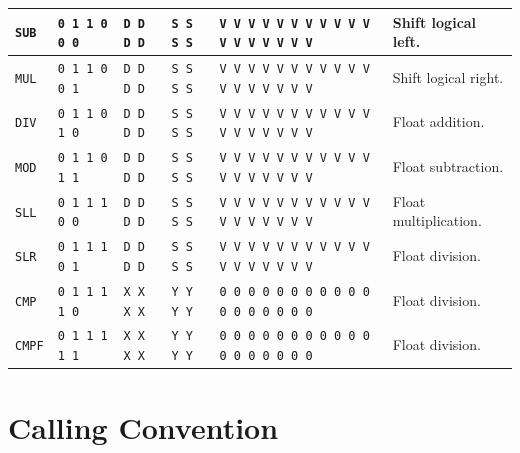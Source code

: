 \documentclass{report}
\begin{document}
{\begin{center}
\begin{tabular}[ht]{
	| p{} | p{} | p{} | p{}
	| p{} | p{} |
}
	\texttt{SUB} & \texttt{0 1 1 0 0 0} & \texttt{D D D D} & \texttt{S S S S} &
		\texttt{V V V V V V V V V V V V V V V V V V} & Shift logical left. \\
	\hline
	
	\texttt{MUL} & \texttt{0 1 1 0 0 1} & \texttt{D D D D} & \texttt{S S S S} &
		\texttt{V V V V V V V V V V V V V V V V V V} & Shift logical right. \\
	\hline
	
	\texttt{DIV} & \texttt{0 1 1 0 1 0} & \texttt{D D D D} & \texttt{S S S S} &
		\texttt{V V V V V V V V V V V V V V V V V V} & Float addition. \\
	\hline
	
	\texttt{MOD} & \texttt{0 1 1 0 1 1} & \texttt{D D D D} & \texttt{S S S S} &
		\texttt{V V V V V V V V V V V V V V V V V V} & Float subtraction. \\
	\hline
	
	\texttt{SLL} & \texttt{0 1 1 1 0 0} & \texttt{D D D D} & \texttt{S S S S} &
		\texttt{V V V V V V V V V V V V V V V V V V} & Float multiplication. \\
	\hline
	
	\texttt{SLR} & \texttt{0 1 1 1 0 1} & \texttt{D D D D} & \texttt{S S S S} &
		\texttt{V V V V V V V V V V V V V V V V V V} & Float division. \\
	\hline
	
	\texttt{CMP} & \texttt{0 1 1 1 1 0} & \texttt{X X X X} & \texttt{Y Y Y Y} &
		\texttt{0 0 0 0 0 0 0 0 0 0 0 0 0 0 0 0 0 0} & Float division. \\
	\hline
	
	\texttt{CMPF} & \texttt{0 1 1 1 1 1} & \texttt{X X X X} & \texttt{Y Y Y Y} &
		\texttt{0 0 0 0 0 0 0 0 0 0 0 0 0 0 0 0 0 0} & Float division. \\
	\hline
\end{tabular}
\end{center}
}



\section{Calling Convention}
\end{document}
